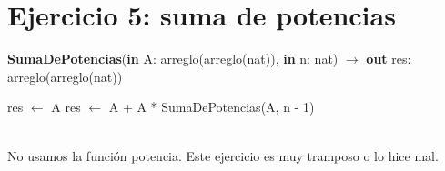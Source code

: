 \section{Ejercicio 5: suma de potencias}

\begin{algorithm}[H]
\caption{
    \textbf{SumaDePotencias}(\textbf{in} A: arreglo(arreglo(nat)), \textbf{in} n: nat) $\to$ \textbf{out} res: arreglo(arreglo(nat))
}
\begin{algorithmic}[1]
        \State res $\gets$ A
    \Else
        \State res $\gets$ A + A * SumaDePotencias(A, n - 1)
    \EndIf
\end{algorithmic}
 \\
No usamos la función potencia. Este ejercicio es muy tramposo o lo hice mal.
\end{algorithm}
